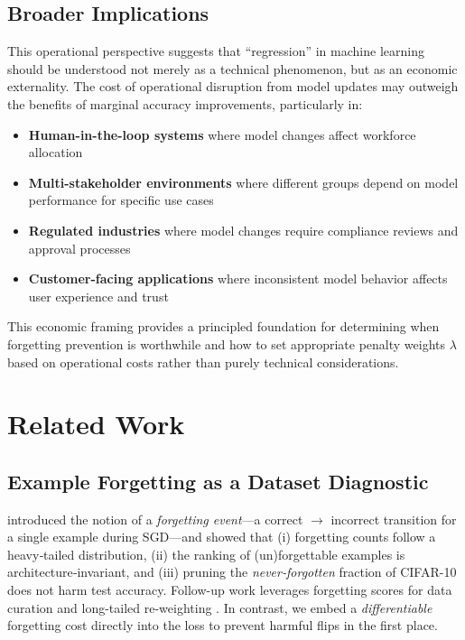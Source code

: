 \documentclass[12pt, letterpaper]{article}
\theoremstyle{remark}
\begin{document}
\subsection{Broader Implications}

This operational perspective suggests that ``regression'' in machine learning should be understood not merely as a technical phenomenon, but as an economic externality. The cost of operational disruption from model updates may outweigh the benefits of marginal accuracy improvements, particularly in:

\begin{itemize}
\item \textbf{Human-in-the-loop systems} where model changes affect workforce allocation
\item \textbf{Multi-stakeholder environments} where different groups depend on model performance for specific use cases  
\item \textbf{Regulated industries} where model changes require compliance reviews and approval processes
\item \textbf{Customer-facing applications} where inconsistent model behavior affects user experience and trust
\end{itemize}

This economic framing provides a principled foundation for determining when forgetting prevention is worthwhile and how to set appropriate penalty weights $\lambda$ based on operational costs rather than purely technical considerations.

\section{Related Work}

\subsection{Example Forgetting as a Dataset Diagnostic}
\citet{toneva2019empirical} introduced the notion of a \emph{forgetting event}—a correct $\rightarrow$ incorrect transition for a single example during SGD—and showed that
(i) forgetting counts follow a heavy‐tailed distribution,
(ii) the ranking of (un)forgettable examples is architecture‐invariant,
and (iii) pruning the \emph{never‐forgotten} fraction of CIFAR-10 does not harm test accuracy.
Follow-up work leverages forgetting scores for data curation \citep{paul2021deep} and long-tailed re-weighting \citep{yu4201044class}.
In contrast, we embed a \emph{differentiable} forgetting cost directly into the loss to prevent harmful flips in the first place.
\end{document}
